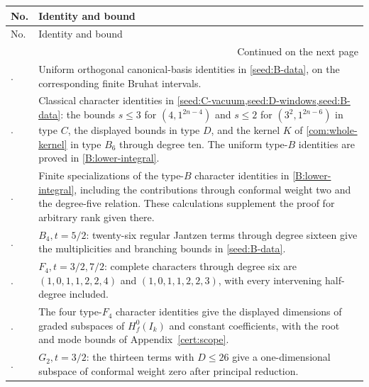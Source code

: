 \documentclass[11pt,a4paper]{amsart}
\numberwithin{equation}{section}
\theoremstyle{definition}
\theoremstyle{remark}
\begin{document}
\renewcommand{\thefinitecalculation}{\thesection.\arabic{finitecalculation}}
{\small\setlength{\tabcolsep}{4pt}
\begin{longtable}{@{}p{}>{\raggedright\arraybackslash}p{}@{}}
\toprule No.&Identity and bound\\\midrule\endfirsthead
\toprule No.&Identity and bound\\\midrule\endhead
\midrule\multicolumn{2}{r}{Continued on the next page}\\\endfoot
\bottomrule\endlastfoot
{}{finitecalculation}\label{calc:B-FOLDS}\thefinitecalculation&Uniform orthogonal canonical-basis identities in \cref{seed:B-data}, on the corresponding finite Bruhat intervals.\\[2pt]
{finitecalculation}\label{calc:BCD}\thefinitecalculation&Classical character identities in \cref{seed:C-vacuum,seed:D-windows,seed:B-data}: the bounds $s\le3$ for $(4,1^{2n-4})$ and $s\le2$ for $(3^2,1^{2n-6})$ in type $C$, the displayed bounds in type $D$, and the kernel $K$ of \cref{com:whole-kernel} in type $B_6$ through degree ten. The uniform type-$B$ identities are proved in \cref{B:lower-integral}.\\[2pt]
{finitecalculation}\label{calc:B-ODD-STRIP}\thefinitecalculation&Finite specializations of the type-$B$ character identities in \cref{B:lower-integral}, including the contributions through conformal weight two and the degree-five relation. These calculations supplement the proof for arbitrary rank given there.\\[2pt]
{finitecalculation}\label{calc:B4-LIFT}\thefinitecalculation&$B_4,t=5/2$: twenty-six regular Jantzen terms through degree sixteen give the multiplicities and branching bounds in \cref{seed:B-data}.\\[2pt]
{finitecalculation}\label{calc:F-CHAR}\thefinitecalculation&$F_4,t=3/2,7/2$: complete characters through degree six are $(1,0,1,1,2,2,4)$ and $(1,0,1,1,2,2,3)$, with every intervening half-degree included.\\[2pt]
{finitecalculation}\label{calc:F-WINDOWS}\thefinitecalculation&The four type-$F_4$ character identities give the displayed dimensions of graded subspaces of $H_f^0(I_k)$ and constant coefficients, with the root and mode bounds of Appendix~\ref{cert:scope}.\\[2pt]
{finitecalculation}\label{calc:G-PRINC}\thefinitecalculation&$G_2,t=3/2$: the thirteen terms with $D\le26$ give a one-dimensional subspace of conformal weight zero after principal reduction.\\[2pt]

\end{longtable}}
\end{document}
